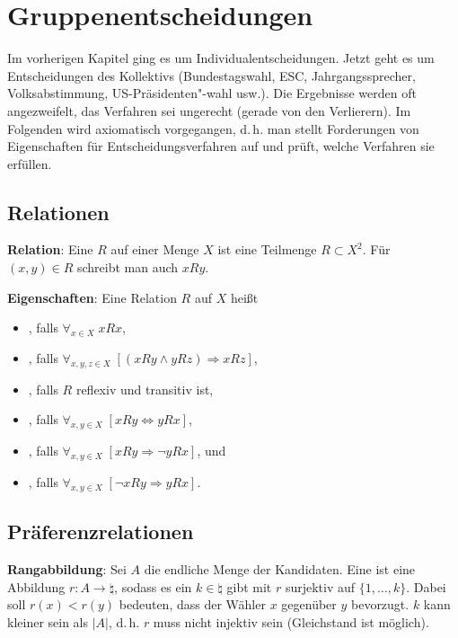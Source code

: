 \chapter{%
    Gruppenentscheidungen%
}

Im vorherigen Kapitel ging es um Individualentscheidungen.
Jetzt geht es um Entscheidungen des Kollektivs
(Bundestagswahl, ESC, Jahrgangssprecher, Volksabstimmung, US-Präsidenten"-wahl usw.).
Die Ergebnisse werden oft angezweifelt, das Verfahren sei ungerecht
(gerade von den Verlierern).
Im Folgenden wird axiomatisch vorgegangen, d.\,h. man stellt Forderungen von Eigenschaften für
Entscheidungsverfahren auf und prüft, welche Verfahren sie erfüllen.

\section{%
    Relationen%
}

\textbf{Relation}:
Eine  $R$ auf einer Menge $X$ ist eine Teilmenge $R \subset X^2$.
Für $(x, y) \in R$ schreibt man auch $xRy$.

\textbf{Eigenschaften}:
Eine Relation $R$ auf $X$ heißt
\begin{itemize}
    \item
    , falls $\forall_{x \in X}\; xRx$,

    \item
    , falls $\forall_{x, y, z \in X}\; [(xRy \land yRz) \Rightarrow xRz]$,

    \item
    , falls $R$ reflexiv und transitiv ist,

    \item
    , falls
    $\forall_{x, y \in X}\; [xRy \Leftrightarrow yRx]$,

    \item
    , falls
    $\forall_{x, y \in X}\; [xRy \Rightarrow \lnot yRx]$, und

    \item
    , falls
    $\forall_{x, y \in X}\; [\lnot xRy \Rightarrow yRx]$.
\end{itemize}

\section{%
    Präferenzrelationen%
}

\textbf{Rangabbildung}:
Sei $A$ die endliche Menge der Kandidaten.
Eine  ist eine Abbildung $r\colon A \to \natural$,
sodass es ein $k \in \natural$ gibt mit $r$ surjektiv auf $\{1, \dotsc, k\}$.
Dabei soll $r(x) < r(y)$ bedeuten, dass der Wähler $x$ gegenüber $y$ bevorzugt.
$k$ kann kleiner sein als $|A|$, d.\,h. $r$ muss nicht injektiv sein
(Gleichstand ist möglich).

